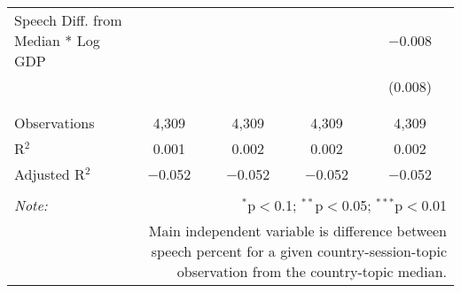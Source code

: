 \begin{table}[!htbp]
\begin{tabular}{@{\extracolsep{5pt}}lcccc}
 Speech Diff. from Median * Log GDP &  &  &  & $-$0.008 \\ 
  &  &  &  & (0.008) \\ 
  & & & & \\ 
\hline \\[-1.8ex] 
Observations & 4,309 & 4,309 & 4,309 & 4,309 \\ 
R$^{2}$ & 0.001 & 0.002 & 0.002 & 0.002 \\ 
Adjusted R$^{2}$ & $-$0.052 & $-$0.052 & $-$0.052 & $-$0.052 \\ 
\hline 
\hline \\[-1.8ex] 
\textit{Note:}  & \multicolumn{4}{r}{$^{*}$p$<$0.1; $^{**}$p$<$0.05; $^{***}$p$<$0.01} \\ 
 & \multicolumn{4}{r}{Main independent variable is difference between speech percent for a given country-session-topic observation from the country-topic median.} \\ 
\end{tabular} 
\end{table} 
